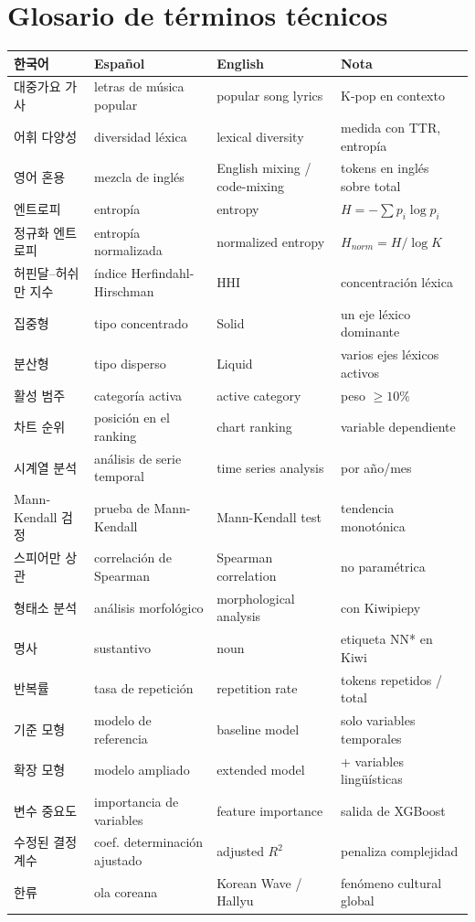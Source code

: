 \documentclass[11pt,a4paper]{article}
\begin{document}
\newpage
\section*{Glosario de términos técnicos}

\renewcommand{\arraystretch}{1.2}
\begin{longtable}{p{3.5cm} p{3.5cm} p{3.5cm} p{3cm}}
\toprule
\textbf{한국어} & \textbf{Español} & \textbf{English} & \textbf{Nota} \\
\midrule
\endhead
대중가요 가사 & letras de música popular & popular song lyrics & K-pop en contexto \\
어휘 다양성 & diversidad léxica & lexical diversity & medida con TTR, entropía \\
영어 혼용 & mezcla de inglés & English mixing / code-mixing & tokens en inglés sobre total \\
엔트로피 & entropía & entropy & $H = -\sum p_i \log p_i$ \\
정규화 엔트로피 & entropía normalizada & normalized entropy & $H_{norm} = H / \log K$ \\
허핀달--허쉬만 지수 & índice Herfindahl-Hirschman & HHI & concentración léxica \\
집중형 & tipo concentrado & Solid & un eje léxico dominante \\
분산형 & tipo disperso & Liquid & varios ejes léxicos activos \\
활성 범주 & categoría activa & active category & peso $\geq 10\%$ \\
차트 순위 & posición en el ranking & chart ranking & variable dependiente \\
시계열 분석 & análisis de serie temporal & time series analysis & por año/mes \\
Mann-Kendall 검정 & prueba de Mann-Kendall & Mann-Kendall test & tendencia monotónica \\
스피어만 상관 & correlación de Spearman & Spearman correlation & no paramétrica \\
형태소 분석 & análisis morfológico & morphological analysis & con Kiwipiepy \\
명사 & sustantivo & noun & etiqueta NN* en Kiwi \\
반복률 & tasa de repetición & repetition rate & tokens repetidos / total \\
기준 모형 & modelo de referencia & baseline model & solo variables temporales \\
확장 모형 & modelo ampliado & extended model & + variables lingüísticas \\
변수 중요도 & importancia de variables & feature importance & salida de XGBoost \\
수정된 결정계수 & coef. determinación ajustado & adjusted $R^2$ & penaliza complejidad \\
한류 & ola coreana & Korean Wave / Hallyu & fenómeno cultural global \\
\bottomrule
\end{longtable}
\end{document}
